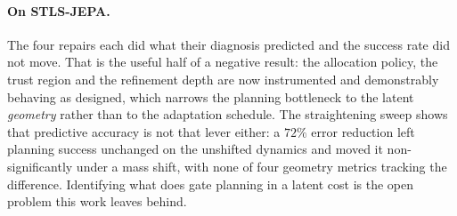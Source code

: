 \paragraph{On STLS-JEPA.} The four repairs each did what their diagnosis predicted and the
success rate did not move. That is the useful half of a negative result: the allocation policy,
the trust region and the refinement depth are now instrumented and demonstrably behaving as
designed, which narrows the planning bottleneck to the latent \emph{geometry} rather than to the
adaptation schedule. The straightening sweep shows that predictive accuracy is not that lever
either: a $72\%$ error reduction left planning success unchanged on the unshifted dynamics and
moved it non-significantly under a mass shift, with none of four geometry metrics tracking the
difference. Identifying what does gate planning in a latent cost is the open problem this work
leaves behind.
